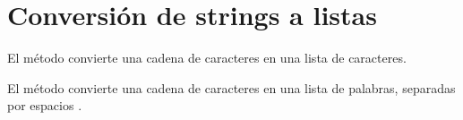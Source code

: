 \section{Conversión de strings a listas}

El método  convierte una cadena de caracteres en una lista de caracteres.


El método  convierte una cadena de caracteres en una lista de palabras, separadas por espacios \ttt{\qq  \qq}.


\clearpage